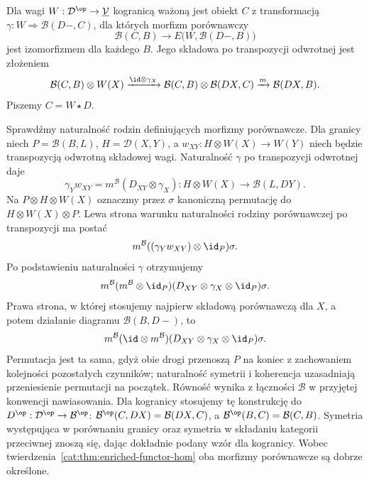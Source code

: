 \begin{definicja}\label{cat:def:enriched-weighted-colimit}
Dla wagi $W:\mathcal D^{\op}\to\underline{\mathcal V}$ kogranicą ważoną jest obiekt $C$ z transformacją $\gamma:W\Rightarrow\mathcal B(D-,C)$, dla których morfizm porównawczy
\[
 \mathcal B(C,B)\longrightarrow
 E\bigl(W,\mathcal B(D-,B)\bigr)
\]
jest izomorfizmem dla każdego $B$. Jego składowa po transpozycji odwrotnej jest złożeniem
\[
 \mathcal B(C,B)\otimes W(X)
 \xrightarrow{\id\otimes\gamma_X}
 \mathcal B(C,B)\otimes\mathcal B(DX,C)
 \xrightarrow{m}\mathcal B(DX,B).
\]
Piszemy $C=W\star D$.
\end{definicja}

Sprawdźmy naturalność rodzin definiujących morfizmy porównawcze. Dla granicy niech $P=\mathcal B(B,L)$, $H=\mathcal D(X,Y)$, a $w_{XY}:H\otimes W(X)\to W(Y)$ niech będzie transpozycją odwrotną składowej wagi. Naturalność $\gamma$ po transpozycji odwrotnej daje
\[
 \gamma_Y w_{XY}
 =m^{\mathcal B}(D_{XY}\otimes\gamma_X):
 H\otimes W(X)\to\mathcal B(L,DY).
\]
Na $P\otimes H\otimes W(X)$ oznaczmy przez $\sigma$ kanoniczną permutację do $H\otimes W(X)\otimes P$. Lewa strona warunku naturalności rodziny porównawczej po transpozycji ma postać
\[
 m^{\mathcal B}((\gamma_Y w_{XY})\otimes\id_P)\sigma.
\]
Po podstawieniu naturalności $\gamma$ otrzymujemy
\[
 m^{\mathcal B}(m^{\mathcal B}\otimes\id_P)
 (D_{XY}\otimes\gamma_X\otimes\id_P)\sigma.
\]
Prawa strona, w której stosujemy najpierw składową porównawczą dla $X$, a potem działanie diagramu $\mathcal B(B,D-)$, to
\[
 m^{\mathcal B}(\id\otimes m^{\mathcal B})
 (D_{XY}\otimes\gamma_X\otimes\id_P)\sigma.
\]
Permutacja jest ta sama, gdyż obie drogi przenoszą $P$ na koniec z zachowaniem kolejności pozostałych czynników; naturalność symetrii i koherencja uzasadniają przeniesienie permutacji na początek. Równość wynika z łączności $\mathcal B$ w przyjętej konwencji nawiasowania. Dla kogranicy stosujemy tę konstrukcję do $D^{\op}:\mathcal D^{\op}\to\mathcal B^{\op}$: $\mathcal B^{\op}(C,DX)=\mathcal B(DX,C)$, a $\mathcal B^{\op}(B,C)=\mathcal B(C,B)$. Symetria występująca w porównaniu granicy oraz symetria w składaniu kategorii przeciwnej znoszą się, dając dokładnie podany wzór dla kogranicy. Wobec twierdzenia~\ref{cat:thm:enriched-functor-hom} oba morfizmy porównawcze są dobrze określone.

